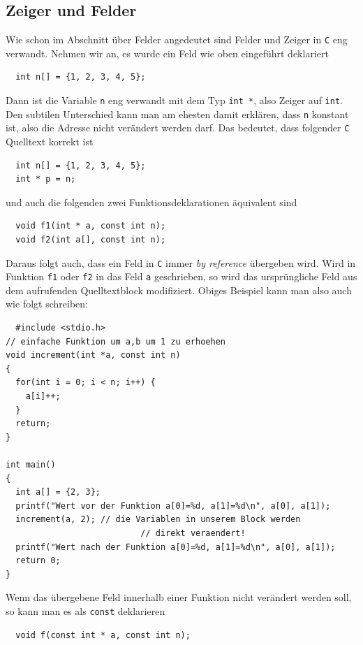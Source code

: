 \subsection{Zeiger und Felder}

Wie schon im Abschnitt über Felder angedeutet sind Felder und Zeiger in \texttt{C} eng verwandt.
Nehmen wir an, es wurde ein Feld wie oben eingeführt deklariert
\begin{lstlisting}
  int n[] = {1, 2, 3, 4, 5};
\end{lstlisting}
Dann ist die Variable \verb|n| eng verwandt mit dem Typ \verb|int *|, also Zeiger auf \verb|int|.
Den subtilen Unterschied kann man am ehesten damit erklären, dass \verb|n| konstant ist, also die Adresse nicht verändert werden darf.
Das bedeutet, dass folgender \texttt{C} Quelltext korrekt ist
\begin{lstlisting}
  int n[] = {1, 2, 3, 4, 5};
  int * p = n;
\end{lstlisting}
und auch die folgenden zwei Funktionsdeklarationen äquivalent sind
\begin{lstlisting}
  void f1(int * a, const int n);
  void f2(int a[], const int n);
\end{lstlisting}
Daraus folgt auch, dass ein Feld in \texttt{C} immer \emph{by reference} übergeben wird.
Wird in Funktion \texttt{f1} oder \texttt{f2} in das Feld \texttt{a} geschrieben, so wird das ursprüngliche Feld aus dem aufrufenden Quelltextblock modifiziert.
Obiges Beispiel kann man also auch wie folgt schreiben:
\begin{lstlisting}
  #include <stdio.h>
// einfache Funktion um a,b um 1 zu erhoehen
void increment(int *a, const int n)
{
  for(int i = 0; i < n; i++) {
    a[i]++;
  }
  return;
}

int main()
{
  int a[] = {2, 3};
  printf("Wert vor der Funktion a[0]=%d, a[1]=%d\n", a[0], a[1]);
  increment(a, 2); // die Variablen in unserem Block werden
                           // direkt veraendert!
  printf("Wert nach der Funktion a[0]=%d, a[1]=%d\n", a[0], a[1]);
  return 0;
}
\end{lstlisting}
Wenn das übergebene Feld innerhalb einer Funktion nicht verändert werden soll, so kann man es als \verb|const| deklarieren 
\begin{lstlisting}
  void f(const int * a, const int n);
\end{lstlisting}

